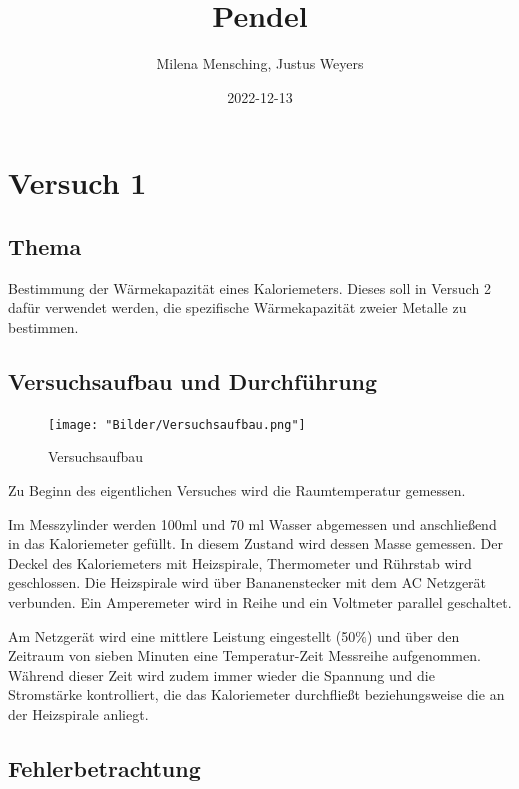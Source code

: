 \documentclass[
  9pt,
]{article}
\title{Pendel}
\author{Milena Mensching, Justus Weyers}
\date{2022-12-13}
\begin{document}
\maketitle

\hypertarget{versuch-1}{%
\section{Versuch 1}\label{versuch-1}}

\hypertarget{thema}{%
\subsection{Thema}\label{thema}}

Bestimmung der Wärmekapazität eines Kaloriemeters. Dieses soll in
Versuch 2 dafür verwendet werden, die spezifische Wärmekapazität zweier
Metalle zu bestimmen.

\hypertarget{versuchsaufbau-und-durchfuxfchrung}{%
\subsection{Versuchsaufbau und
Durchführung}\label{versuchsaufbau-und-durchfuxfchrung}}

\begin{figure}
\centering
\texttt{[image: "Bilder/Versuchsaufbau.png"]}
\caption{Versuchsaufbau}
\end{figure}

Zu Beginn des eigentlichen Versuches wird die Raumtemperatur gemessen.

Im Messzylinder werden 100ml und 70 ml Wasser abgemessen und
anschließend in das Kaloriemeter gefüllt. In diesem Zustand wird dessen
Masse gemessen. Der Deckel des Kaloriemeters mit Heizspirale,
Thermometer und Rührstab wird geschlossen. Die Heizspirale wird über
Bananenstecker mit dem AC Netzgerät verbunden. Ein Amperemeter wird in
Reihe und ein Voltmeter parallel geschaltet.

Am Netzgerät wird eine mittlere Leistung eingestellt (50\%) und über den
Zeitraum von sieben Minuten eine Temperatur-Zeit Messreihe aufgenommen.
Während dieser Zeit wird zudem immer wieder die Spannung und die
Stromstärke kontrolliert, die das Kaloriemeter durchfließt
beziehungsweise die an der Heizspirale anliegt.

\hypertarget{fehlerbetrachtung}{%
\subsection{Fehlerbetrachtung}\label{fehlerbetrachtung}}
\end{document}
